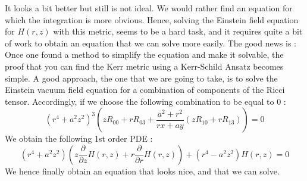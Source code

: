 \documentclass[a4paper,12pt]{article}
\theoremstyle{definition}
\begin{document}
It looks a bit better but still is not ideal.
We would rather find an equation for which the integration is more obvious.
Hence, solving the Einstein field equation for $H(r,z)$ with this metric, seems to be a hard task,
and it requires quite a bit of work to obtain an equation that we can solve more easily.
The good news is : Once one found a method to simplify the equation and make it solvable, the proof that you can find the Kerr metric using a Kerr-Schild Ansatz becomes simple.
A good approach, the one that we are going to take, is to solve the Einstein vacuum field equation for a combination of components of the Ricci tensor.
Accordingly, if we choose the following combination to be equal to $0$ :
\begin{equation}
	(r^4+a^2z^2)^3(zR_{00}+rR_{03}+\frac{a^2+r^2}{rx+ay}(zR_{10}+rR_{13}))=0
\end{equation}
We obtain the following 1st order PDE :
\begin{equation}\label{Kerr:equation}
	(r^4+a^2z^2)(z \frac{\partial}{\partial z}H(r,z)+r\frac{\partial}{\partial r}H(r,z))+(r^4-a^2 z^2) H(r,z)=0
\end{equation}
We hence finally obtain an equation that looks nice, and that we can solve.
\end{document}
